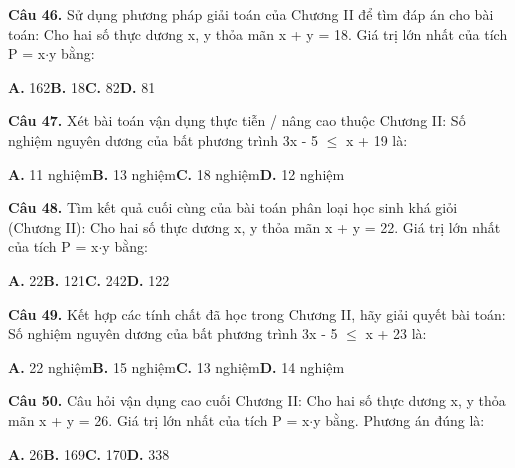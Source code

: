 \documentclass[11pt,a4paper]{article}
\begin{document}
\textbf{\color{primary} Câu 46.} Sử dụng phương pháp giải toán của Chương II để tìm đáp án cho bài toán: Cho hai số thực dương x, y thỏa mãn x + y = 18. Giá trị lớn nhất của tích P = x$\cdot$y bằng:\par
\hspace*{1.5em}\textbf{A.} 162\quad\quad \textbf{B.} 18\quad\quad \textbf{C.} 82\quad\quad \textbf{D.} 81\par\vspace{2pt}
\textbf{\color{primary} Câu 47.} Xét bài toán vận dụng thực tiễn / nâng cao thuộc Chương II: Số nghiệm nguyên dương của bất phương trình 3x - 5 $\le$ x + 19 là:\par
\hspace*{1.5em}\textbf{A.} 11 nghiệm\quad\quad \textbf{B.} 13 nghiệm\quad\quad \textbf{C.} 18 nghiệm\quad\quad \textbf{D.} 12 nghiệm\par\vspace{2pt}
\textbf{\color{primary} Câu 48.} Tìm kết quả cuối cùng của bài toán phân loại học sinh khá giỏi (Chương II): Cho hai số thực dương x, y thỏa mãn x + y = 22. Giá trị lớn nhất của tích P = x$\cdot$y bằng:\par
\hspace*{1.5em}\textbf{A.} 22\quad\quad \textbf{B.} 121\quad\quad \textbf{C.} 242\quad\quad \textbf{D.} 122\par\vspace{2pt}
\textbf{\color{primary} Câu 49.} Kết hợp các tính chất đã học trong Chương II, hãy giải quyết bài toán: Số nghiệm nguyên dương của bất phương trình 3x - 5 $\le$ x + 23 là:\par
\hspace*{1.5em}\textbf{A.} 22 nghiệm\quad\quad \textbf{B.} 15 nghiệm\quad\quad \textbf{C.} 13 nghiệm\quad\quad \textbf{D.} 14 nghiệm\par\vspace{2pt}
\textbf{\color{primary} Câu 50.} Câu hỏi vận dụng cao cuối Chương II: Cho hai số thực dương x, y thỏa mãn x + y = 26. Giá trị lớn nhất của tích P = x$\cdot$y bằng. Phương án đúng là:\par
\hspace*{1.5em}\textbf{A.} 26\quad\quad \textbf{B.} 169\quad\quad \textbf{C.} 170\quad\quad \textbf{D.} 338\par\vspace{2pt}
\end{document}
